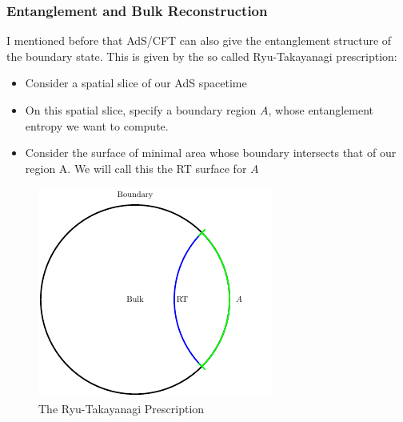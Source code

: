 \documentclass[8pt,aspectratio=169]{beamer}
\begin{document}
\begin{frame}
\frametitle{Entanglement and Bulk Reconstruction}

I mentioned before that AdS/CFT can also give the entanglement structure of the boundary state. This is given by the so called Ryu-Takayanagi prescription: 

\begin{minipage}[t]{0.55\linewidth}

\begin{itemize}

\item Consider a spatial slice of our AdS spacetime

\item On this spatial slice, specify a boundary region $A$, whose entanglement entropy we want to compute. 

\item Consider the surface of minimal area whose boundary intersects that of our region A. We will call this the RT surface for $A$

\end{itemize}

\end{minipage}\hfill
%
\begin{minipage}[t]{0.44\linewidth}

\begin{figure}
    \begin{center}
    
        \includegraphics[scale=1]{RT}    
    
    \end{center}
    \caption{The Ryu-Takayanagi Prescription}
    \label{fig:WDW}
\end{figure}

\end{minipage}

\end{frame}
\end{document}
